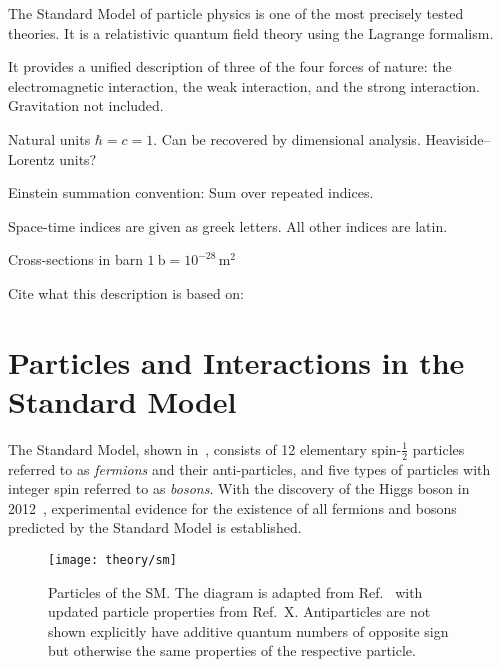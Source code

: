 The Standard Model of particle physics is one of the most precisely tested
theories. It is a relatistivic quantum field theory using the Lagrange
formalism.

It provides a unified description of three of the four forces of nature: the
electromagnetic interaction, the weak interaction, and the strong
interaction. Gravitation not included.

Natural units $\hbar = c = 1$. Can be recovered by dimensional
analysis. Heaviside--Lorentz units?

Einstein summation convention: Sum over repeated indices.

Space-time indices are given as greek letters. All other indices are latin.

Cross-sections in barn $\SI{1}{\barn} = 10^{-28}\,\si{\metre\squared}$

Cite what this description is based on: \cite{Halzen:1984mc,Thomson:2013zua}


\section{Particles and Interactions in the Standard Model}

The Standard Model, shown in~, consists of 12 elementary
spin-$\frac{1}{2}$ particles referred to as \emph{fermions} and their
anti-particles, and five types of particles with integer spin referred to as
\emph{bosons}. With the discovery of the Higgs boson in
2012~\cite{HIGG-2012-27,CMS-HIG-12-028}, experimental evidence for the existence
of all fermions and bosons predicted by the Standard Model is established.

\begin{figure}[htbp]
  \centering

  \texttt{[image: theory/sm]}

  \caption{Particles of the SM. The diagram is adapted from Ref.~\cite{sm_tikz}
    with updated particle properties from Ref.~X. Antiparticles are not shown
    explicitly have additive quantum numbers of opposite sign but otherwise the
    same properties of the respective particle.}
  \label{fig:sm_particles}
\end{figure}


